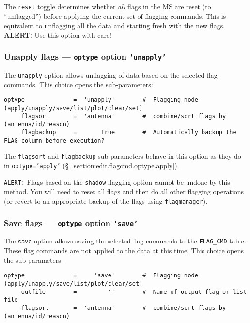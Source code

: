 The {\tt reset} toggle determines whether {\em all} flags in the MS
are reset (to ``unflagged'') before applying the current set of
flagging commands.  This is equivalent to unflagging all the data
and starting fresh with the new flags.  
{\bf ALERT:} Use this option with care!

\subsubsection{Unapply flags --- {\tt optype} option {\tt 'unapply'}}
\label{section:edit.flagcmd.optype.unapply}

The {\tt unapply} option allows unflagging of data based on the selected flag commands.
This choice opens the sub-parameters:
\small
\begin{verbatim}
optype              =  'unapply'        #  Flagging mode (apply/unapply/save/list/plot/clear/set)
     flagsort       =  'antenna'        #  combine/sort flags by (antenna/id/reason)
     flagbackup     =       True        #  Automatically backup the FLAG column before execution?
\end{verbatim}
\normalsize

The {\tt flagsort} and {\tt flagbackup} sub-parameters behave in this
option as they do in {\tt optype='apply'} 
(\S~\ref{section:edit.flagcmd.optype.apply}).

{\tt ALERT:} Flags based on the {\tt shadow} flagging option cannot be
undone by this method.  You will need to reset all flags and then do
all other flagging operations (or revert to an appropriate backup of
the flags using {\tt flagmanager}).

\subsubsection{Save flags --- {\tt optype} option {\tt 'save'}}
\label{section:edit.flagcmd.optype.save}

The {\tt save} option allows saving the selected flag commands to
the {\tt FLAG\_CMD} table.  These flag commands are not applied to the
data at this time.
This choice opens the sub-parameters:
\small
\begin{verbatim}
optype              =     'save'        #  Flagging mode (apply/unapply/save/list/plot/clear/set)
     outfile        =         ''        #  Name of output flag or list file
     flagsort       =  'antenna'        #  combine/sort flags by (antenna/id/reason)
\end{verbatim}
\normalsize


